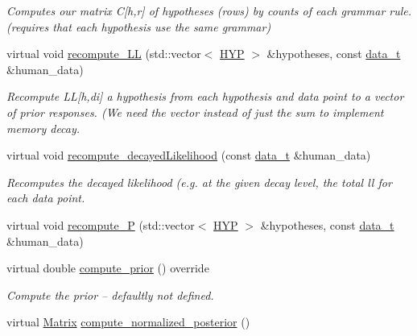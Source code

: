 \begin{DoxyCompactItemize}
\begin{DoxyCompactList}\small\item\em Computes our matrix C\mbox{[}h,r\mbox{]} of hypotheses (rows) by counts of each grammar rule. (requires that each hypothesis use the same grammar) \end{DoxyCompactList}\item 
virtual void \hyperlink{class_grammar_hypothesis_aa55913a4798b21974f225ec40193cfc1}{recompute\+\_\+\+LL} (std\+::vector$<$ \hyperlink{class_grammar_hypothesis_a28fc99df28de741179719c94ecd77699}{H\+YP} $>$ \&hypotheses, const \hyperlink{class_bayesable_aa2788c4d7718c0a824e1d28c4c98f921}{data\+\_\+t} \&human\+\_\+data)
\begin{DoxyCompactList}\small\item\em Recompute LL\mbox{[}h,di\mbox{]} a hypothesis from each hypothesis and data point to a {\itshape vector} of prior responses. (We need the vector instead of just the sum to implement memory decay. \end{DoxyCompactList}\item 
virtual void \hyperlink{class_grammar_hypothesis_a8476132b0ea0f4d0743dde525ce37ba9}{recompute\+\_\+decayed\+Likelihood} (const \hyperlink{class_bayesable_aa2788c4d7718c0a824e1d28c4c98f921}{data\+\_\+t} \&human\+\_\+data)
\begin{DoxyCompactList}\small\item\em Recomputes the decayed likelihood (e.\+g. at the given decay level, the total ll for each data point. \end{DoxyCompactList}\item 
virtual void \hyperlink{class_grammar_hypothesis_a5dc4c47ed55185ec1d1376bd0e7cdb40}{recompute\+\_\+P} (std\+::vector$<$ \hyperlink{class_grammar_hypothesis_a28fc99df28de741179719c94ecd77699}{H\+YP} $>$ \&hypotheses, const \hyperlink{class_bayesable_aa2788c4d7718c0a824e1d28c4c98f921}{data\+\_\+t} \&human\+\_\+data)
\item 
virtual double \hyperlink{class_grammar_hypothesis_a8ad537345ab55b581825b89c9b2cfad3}{compute\+\_\+prior} () override
\begin{DoxyCompactList}\small\item\em Compute the prior -- defaultly not defined. \end{DoxyCompactList}\item 
virtual \hyperlink{_eigen_lib_8h_a645222978e81acfb2523a9bce34aecc0}{Matrix} \hyperlink{class_grammar_hypothesis_a2e4105060c6b5e96679fdb116591b3f1}{compute\+\_\+normalized\+\_\+posterior} ()

\end{DoxyCompactItemize}
